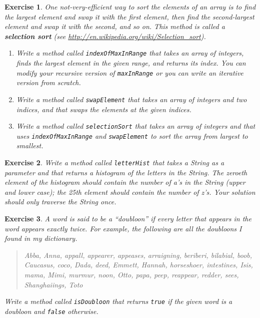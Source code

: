\documentclass[12pt]{book}
\theoremstyle{exercise}
\newtheorem{exercise}{Exercise}[chapter]
\begin{document}
\begin{exercise}
One not-very-efficient way to sort the elements of an array
is to find the largest element and swap it with the first
element, then find the second-largest element and swap it with
the second, and so on.  This method is called a {\bf selection
sort} (see \url{http://en.wikipedia.org/wiki/Selection_sort}).

\begin{enumerate}

\item Write a method called {\tt indexOfMaxInRange} that
takes an array of integers, finds the
largest element in the given range, and returns its {\em index}.
You can modify your recursive version of {\tt maxInRange} or
you can write an iterative version from scratch.

\item Write a method called {\tt swapElement} that takes an
array of integers and two indices, and that swaps the elements
at the given indices.

\item Write a method called {\tt selectionSort} that takes an array of
integers and that uses {\tt indexOfMaxInRange} and {\tt swapElement}
to sort the array from largest to smallest.

\end{enumerate}
\end{exercise}


\begin{exercise}
Write a method called {\tt letterHist} that takes a String as a
parameter and that returns a histogram of the letters in the String.
The zeroeth element of the histogram should contain the number of a's
in the String (upper and lower case); the 25th element should contain
the number of z's.
Your solution should only traverse the String once.
\end{exercise}


\begin{exercise}
A word is said to be a ``doubloon'' if every letter that appears in the
word appears exactly twice.  For example, the following are all the
doubloons I found in my dictionary.

\begin {quote}
Abba, Anna, appall, appearer, appeases, arraigning, beriberi,
bilabial, boob, Caucasus, coco, Dada, deed, Emmett, Hannah,
horseshoer, intestines, Isis, mama, Mimi, murmur, noon, Otto, papa,
peep, reappear, redder, sees, Shanghaiings, Toto
\end{quote}

Write a method called {\tt isDoubloon} that returns {\tt true}
if the given word is a doubloon and {\tt false} otherwise.
\end{exercise}
\end{document}
